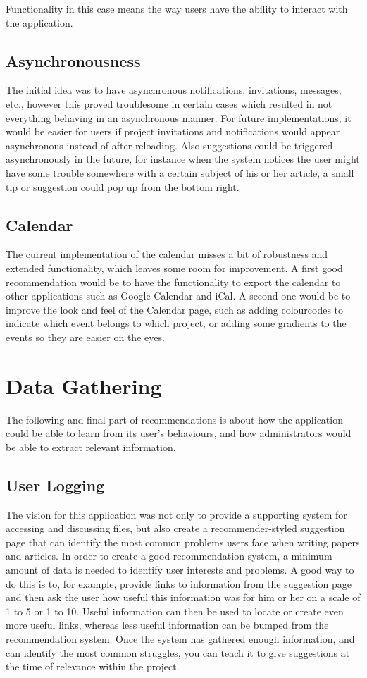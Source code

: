 Functionality in this case means the way users have the ability to interact with the application.

\subsection{Asynchronousness}

The initial idea was to have asynchronous notifications, invitations, messages, etc., however this proved troublesome in certain
cases which resulted in not everything behaving in an asynchronous manner. For future implementations, it would be easier for users
if project invitations and notifications would appear asynchronous instead of after reloading. Also suggestions could be
triggered asynchronously in the future, for instance when the system notices the user might have some trouble somewhere with
a certain subject of his or her article, a small tip or suggestion could pop up from the bottom right.

\subsection{Calendar}

The current implementation of the calendar misses a bit of robustness and extended functionality, which leaves some room for
improvement. A first good recommendation would be to have the functionality to export the calendar to other applications such as
Google Calendar and iCal. A second one would be to improve the look and feel of the Calendar page, such as adding colourcodes to
indicate which event belongs to which project, or adding some gradients to the events so they are easier on the eyes.

\section{Data Gathering}

The following and final part of recommendations is about how the application could be able to learn from its user's behaviours,
and how administrators would be able to extract relevant information.

\subsection{User Logging}

The vision for this application was not only to provide a supporting system for accessing and discussing files, but also create
a recommender-styled suggestion page that can identify the most common problems users face when writing papers and articles.
In order to create a good recommendation system, a minimum amount of data is needed to identify user interests and problems.
A good way to do this is to, for example, provide links to information from the suggestion page and then ask the user
how useful this information was for him or her on a scale of 1 to 5 or 1 to 10. Useful information can then be used to locate
or create even more useful links, whereas less useful information can be bumped from the recommendation system. Once the system
has gathered enough information, and can identify the most common struggles, you can teach it to give suggestions at the time
of relevance within the project. 